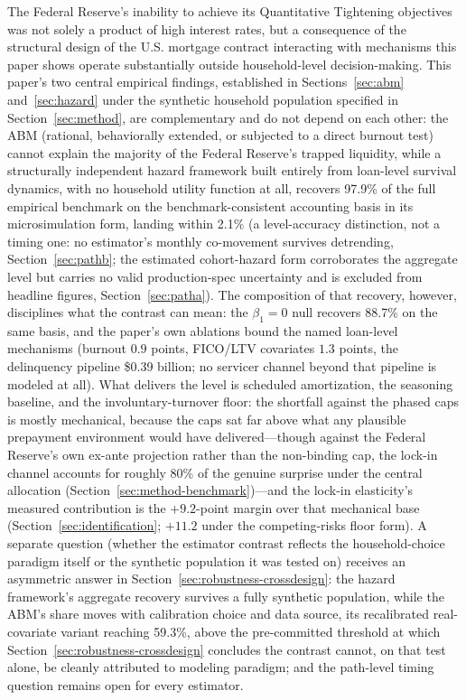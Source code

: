 \documentclass[12pt]{article}
\begin{document}
The Federal Reserve's inability to achieve its Quantitative Tightening objectives was not solely a product of high interest rates, but a consequence of the structural design of the U.S. mortgage contract interacting with mechanisms this paper shows operate substantially outside household-level decision-making. This paper's two central empirical findings, established in Sections~\ref{sec:abm} and~\ref{sec:hazard} under the synthetic household population specified in Section~\ref{sec:method}, are complementary and do not depend on each other: the ABM (rational, behaviorally extended, or subjected to a direct burnout test) cannot explain the majority of the Federal Reserve's trapped liquidity, while a structurally independent hazard framework built entirely from loan-level survival dynamics, with no household utility function at all, recovers 97.9\% of the full empirical benchmark on the benchmark-consistent accounting basis in its microsimulation form, landing within 2.1\% (a level-accuracy distinction, not a timing one: no estimator's monthly co-movement survives detrending, Section~\ref{sec:pathb}; the estimated cohort-hazard form corroborates the aggregate level but carries no valid production-spec uncertainty and is excluded from headline figures, Section~\ref{sec:patha}). The composition of that recovery, however, disciplines what the contrast can mean: the $\beta_1 = 0$ null recovers 88.7\% on the same basis, and the paper's own ablations bound the named loan-level mechanisms (burnout $0.9$ points, FICO/LTV covariates $1.3$ points, the delinquency pipeline \$0.39 billion; no servicer channel beyond that pipeline is modeled at all). What delivers the level is scheduled amortization, the seasoning baseline, and the involuntary-turnover floor: the shortfall against the phased caps is mostly mechanical, because the caps sat far above what any plausible prepayment environment would have delivered---though against the Federal Reserve's own ex-ante projection rather than the non-binding cap, the lock-in channel accounts for roughly 80\% of the genuine surprise under the central allocation (Section~\ref{sec:method-benchmark})---and the lock-in elasticity's measured contribution is the $+9.2$-point margin over that mechanical base (Section~\ref{sec:identification}; $+11.2$ under the competing-risks floor form). A separate question (whether the estimator contrast reflects the household-choice paradigm itself or the synthetic population it was tested on) receives an asymmetric answer in Section~\ref{sec:robustness-crossdesign}: the hazard framework's aggregate recovery survives a fully synthetic population, while the ABM's share moves with calibration choice and data source, its recalibrated real-covariate variant reaching 59.3\%, above the pre-committed threshold at which Section~\ref{sec:robustness-crossdesign} concludes the contrast cannot, on that test alone, be cleanly attributed to modeling paradigm; and the path-level timing question remains open for every estimator.
\end{document}
